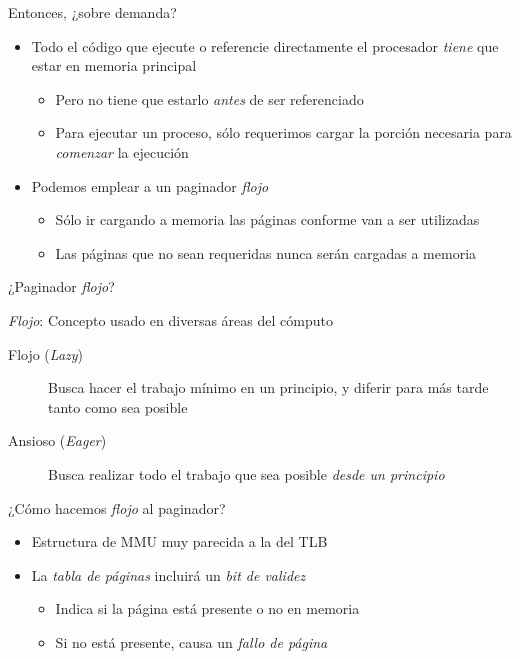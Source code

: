 \documentclass[presentation]{beamer}
\begin{document}
\begin{frame}[label={sec:org2d5f48e}]{Entonces, ¿sobre demanda?}
\begin{itemize}
\item Todo el código que ejecute o referencie directamente el procesador
\emph{tiene} que estar en memoria principal
\begin{itemize}
\item Pero no tiene que estarlo \emph{antes} de ser referenciado
\item Para ejecutar un proceso, sólo requerimos cargar la porción
necesaria para \emph{comenzar} la ejecución
\end{itemize}
\item Podemos emplear a un paginador \emph{flojo}
\begin{itemize}
\item Sólo ir cargando a memoria las páginas conforme van a ser
utilizadas
\item Las páginas que no sean requeridas nunca serán cargadas a memoria
\end{itemize}
\end{itemize}
\end{frame}

\begin{frame}[label={sec:org7b50a14}]{¿Paginador \emph{flojo}?}
\begin{center}
\emph{Flojo}: Concepto usado en diversas áreas del cómputo
\end{center}
\begin{description}
\item[{Flojo (\emph{Lazy})}] Busca hacer el trabajo mínimo en un principio, y
diferir para más tarde tanto como sea posible
\item[{Ansioso (\emph{Eager})}] Busca realizar todo el trabajo que sea
posible \emph{desde un principio}
\end{description}
\end{frame}

\begin{frame}[label={sec:org9d2d611}]{¿Cómo hacemos \emph{flojo} al paginador?}
\begin{itemize}
\item Estructura de MMU muy parecida a la del TLB
\item La \emph{tabla de páginas} incluirá un \emph{bit de validez}
\begin{itemize}
\item Indica si la página está presente o no en memoria
\item Si no está presente, causa un \emph{fallo de página}
\end{itemize}
\end{itemize}
\end{frame}
\end{document}
